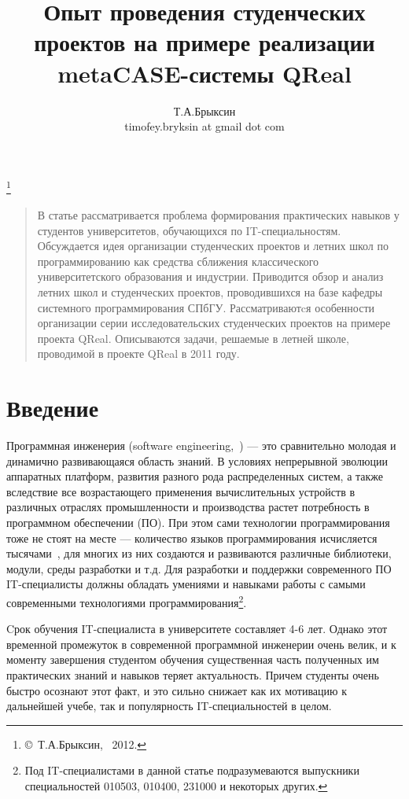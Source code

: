\documentclass[a4paper]{article}
\title{Опыт проведения студенческих проектов на примере реализации metaCASE-системы QReal}
\author{Т.А.Брыксин \\ timofey.bryksin at gmail dot com}
\date{}
\begin{document}
\maketitle
\thispagestyle{empty}


\renewcommand{\thefootnote}{}
\footnote{\small{\copyright~Т.А.Брыксин, ~2012.}}
\renewcommand{\thefootnote}{\arabic{footnote}}
\setcounter{footnote}{0}

\begin{quote}
\small\noindent
В статье рассматривается проблема формирования практических навыков у студентов университетов, обучающихся по IT-специальностям. Обсуждается идея организации студенческих проектов и летних школ по программированию как средства сближения классического университетского образования и индустрии. Приводится обзор и анализ летних школ и студенческих проектов, проводившихся на базе кафедры системного программирования СПбГУ. Рассматриваютcя особенности организации серии исследовательских студенческих проектов на примере проекта QReal. Описываются задачи, решаемые в летней школе, проводимой в проекте QReal в 2011 году. 
\end{quote}


\section*{Введение} 
Программная инженерия (software engineering,~\cite{terekhov1, swebok}) --- это сравнительно молодая и динамично развивающаяся область знаний. В условиях непрерывной эволюции аппаратных платформ, развития разного рода распределенных систем, а также вследствие все возрастающего применения вычислительных устройств в различных отраслях промышленности и производства растет потребность в программном обеспечении (ПО).  При этом сами технологии программирования тоже не стоят на месте --- количество языков программирования исчисляется тысячами~\cite{langList}, для многих из них создаются и развиваются различные библиотеки, модули, среды разработки и т.д. Для разработки и поддержки современного ПО IT-специалисты должны обладать умениями и навыками работы с самыми современными технологиями программирования\footnote{Под IT-специалистами в данной статье подразумеваются выпускники специальностей 010503, 010400, 231000 и некоторых других.}. 
 
Cрок обучения IT-специалиста в университете составляет 4-6 лет. Однако этот временной промежуток  в современной программной инженерии очень велик, и к моменту завершения студентом обучения существенная часть полученных им практических знаний и навыков теряет актуальность. Причем студенты очень быстро осознают этот факт, и это сильно снижает как их мотивацию к дальнейшей учебе, так и популярность IT-специальностей в целом. 
\end{document}

